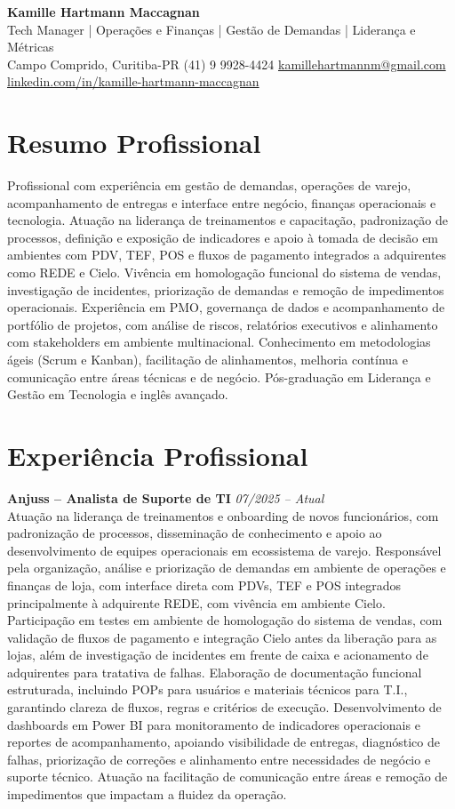 \documentclass[11pt,a4paper]{article}
\newcommand{\cvheader}[4]{%
  \begin{center}
    {\LARGE\bfseries #1}\\[4pt]
    {\large #2}\\[6pt]
    #3\\[2pt]
    #4
  \end{center}
  \vspace{4pt}
}
\newcommand{\experience}[3]{%
  \textbf{#1} \hfill \textit{#2}\\[4pt]
  #3
  \vspace{8pt}
}
\begin{document}
\cvheader{Kamille Hartmann Maccagnan}%
{Tech Manager | Operações e Finanças | Gestão de Demandas | Liderança e Métricas}%
{Campo Comprido, Curitiba-PR \textbullet{} (41) 9 9928-4424 \textbullet{} \href{mailto:kamillehartmannm@gmail.com}{kamillehartmannm@gmail.com}}%
{\href{https://linkedin.com/in/kamille-hartmann-maccagnan/}{linkedin.com/in/kamille-hartmann-maccagnan}}

\section*{Resumo Profissional}

Profissional com experiência em gestão de demandas, operações de varejo, acompanhamento de entregas e interface entre negócio, finanças operacionais e tecnologia. Atuação na liderança de treinamentos e capacitação, padronização de processos, definição e exposição de indicadores e apoio à tomada de decisão em ambientes com PDV, TEF, POS e fluxos de pagamento integrados a adquirentes como REDE e Cielo. Vivência em homologação funcional do sistema de vendas, investigação de incidentes, priorização de demandas e remoção de impedimentos operacionais. Experiência em PMO, governança de dados e acompanhamento de portfólio de projetos, com análise de riscos, relatórios executivos e alinhamento com stakeholders em ambiente multinacional. Conhecimento em metodologias ágeis (Scrum e Kanban), facilitação de alinhamentos, melhoria contínua e comunicação entre áreas técnicas e de negócio. Pós-graduação em Liderança e Gestão em Tecnologia e inglês avançado.

\section*{Experiência Profissional}

\experience{Anjuss -- Analista de Suporte de TI}{07/2025 -- Atual}{%
Atuação na liderança de treinamentos e onboarding de novos funcionários, com padronização de processos, disseminação de conhecimento e apoio ao desenvolvimento de equipes operacionais em ecossistema de varejo. Responsável pela organização, análise e priorização de demandas em ambiente de operações e finanças de loja, com interface direta com PDVs, TEF e POS integrados principalmente à adquirente REDE, com vivência em ambiente Cielo. Participação em testes em ambiente de homologação do sistema de vendas, com validação de fluxos de pagamento e integração Cielo antes da liberação para as lojas, além de investigação de incidentes em frente de caixa e acionamento de adquirentes para tratativa de falhas. Elaboração de documentação funcional estruturada, incluindo POPs para usuários e materiais técnicos para T.I., garantindo clareza de fluxos, regras e critérios de execução. Desenvolvimento de dashboards em Power BI para monitoramento de indicadores operacionais e reportes de acompanhamento, apoiando visibilidade de entregas, diagnóstico de falhas, priorização de correções e alinhamento entre necessidades de negócio e suporte técnico. Atuação na facilitação de comunicação entre áreas e remoção de impedimentos que impactam a fluidez da operação.}
\end{document}
